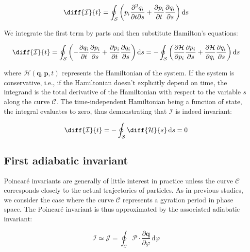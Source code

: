 \begin{equation}
    \diff{\mathcal{I}}{t}=\oint_{\mathcal{S}}\left(p_i\frac{\partial^2q_i}{\partial t\partial s}+\frac{\partial p_i}{\partial t}\frac{\partial q_i}{\partial s}\right)\mathrm{d}s
\end{equation}

We integrate the first term by parts and then substitute Hamilton's equations:

\begin{equation}
    \diff{\mathcal{I}}{t}=\oint_\mathcal{S}\left(-\frac{\partial q_i}{\partial t}\frac{\partial p_i}{\partial s}+\frac{\partial p_i}{\partial t}\frac{\partial q_i}{\partial s}\right)\mathrm{d}s=-\oint_\mathcal{S}\left(\frac{\partial\mathcal{H}}{\partial p_i}\frac{\partial p_i}{\partial s}+\frac{\partial\mathcal{H}}{\partial q_i}\frac{\partial q_i}{\partial s}\right)\mathrm{d}s
\end{equation}

where $\mathcal{H}(\mathbf{q},\mathbf{p},t)$ represents the Hamiltonian of the system. If the system is conservative, i.e., if the Hamiltonian doesn't explicitly depend on time, the integrand is the total derivative of the Hamiltonian with respect to the variable $s$ along the curve $\mathcal{C}$. The time-independent Hamiltonian being a function of state, the integral evaluates to zero, thus demonstrating that $\mathcal{I}$ is indeed invariant:

\begin{equation}
    \diff{\mathcal{I}}{t}=-\oint_\mathcal{S}\diff{\mathcal{H}}{s}\,\mathrm{d}s=0
\end{equation}

\subsection{First adiabatic invariant}

\label{sec2-9-1}

Poincaré invariants are generally of little interest in practice unless the curve $\mathcal{C}$ corresponds closely to the actual trajectories of particles. As in previous studies, we consider the case where the curve $\mathcal{C}$ represents a gyration period in phase space. The Poincaré invariant is thus approximated by the associated adiabatic invariant:

\begin{equation}
    \mathcal{I}\simeq\mathcal{J}=\oint_\mathcal{C}\boldsymbol{\mathcal{P}}\cdot\frac{\partial\mathbf{q}}{\partial\varphi}\,\mathrm{d}\varphi
\end{equation}

